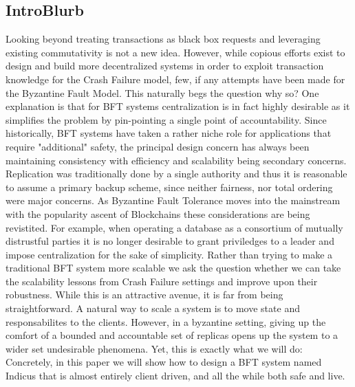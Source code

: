 \subsection{IntroBlurb}
Looking beyond treating transactions as black box requests and leveraging existing commutativity is not a new idea. However, while copious efforts exist to design and build more decentralized systems in order to exploit transaction knowledge for the Crash Failure model, few, if any attempts have been made for the Byzantine Fault Model. This naturally begs the question why so? One explanation is that for BFT systems centralization is in fact highly desirable as it simplifies the problem by pin-pointing a single point of accountability. Since historically, BFT systems have taken a rather niche role for applications that require "additional" safety, the principal design concern has always been maintaining consistency with efficiency and scalability being secondary concerns. Replication was traditionally done by a single authority and thus it is reasonable to assume a primary backup scheme, since neither fairness, nor total ordering were major concerns. As Byzantine Fault Tolerance moves into the mainstream with the popularity ascent of Blockchains these considerations are being revistited. For example, when operating a database as a consortium of mutually distrustful parties it is no longer desirable to grant priviledges to a leader and impose centralization for the sake of simplicity.
Rather than trying to make a traditional BFT system more scalable we ask the question whether we can take the scalability lessons from Crash Failure settings and improve upon their robustness. While this is an attractive avenue, it is far from being straightforward. A natural way to scale a system is to move state and responsabilites to the clients.  
However, in a byzantine setting, giving up the comfort of a bounded and accountable set of replicas opens up the system to a wider set undesirable phenomena. Yet, this is exactly what we will do: Concretely, in this paper we will show how to design a BFT system named Indicus that is almost entirely client driven, and all the while both safe and live. \\

